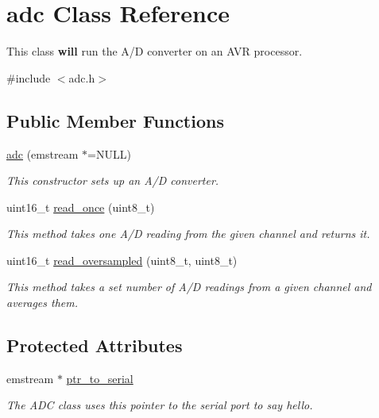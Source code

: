 \hypertarget{classadc}{\section{adc Class Reference}
\label{classadc}
}


This class {\bfseries will} run the A/\-D converter on an A\-V\-R processor.  




{\ttfamily \#include $<$adc.\-h$>$}

\subsection*{Public Member Functions}
\begin{DoxyCompactItemize}
\item 
\hyperlink{classadc_af3b8262c08f5fc5ae325a20622883424}{adc} (emstream $\ast$=N\-U\-L\-L)
\begin{DoxyCompactList}\small\item\em This constructor sets up an A/\-D converter. \end{DoxyCompactList}\item 
uint16\-\_\-t \hyperlink{classadc_a2190a59696a7093e1ea605e998ccf97e}{read\-\_\-once} (uint8\-\_\-t)
\begin{DoxyCompactList}\small\item\em This method takes one A/\-D reading from the given channel and returns it. \end{DoxyCompactList}\item 
uint16\-\_\-t \hyperlink{classadc_a58f1030fe64d3dea4ccd8a2687dd6fce}{read\-\_\-oversampled} (uint8\-\_\-t, uint8\-\_\-t)
\begin{DoxyCompactList}\small\item\em This method takes a set number of A/\-D readings from a given channel and averages them. \end{DoxyCompactList}\end{DoxyCompactItemize}
\subsection*{Protected Attributes}
\begin{DoxyCompactItemize}
\item 
\hypertarget{classadc_a14680b48b723bf1adddd2741ebb18a3e}{emstream $\ast$ \hyperlink{classadc_a14680b48b723bf1adddd2741ebb18a3e}{ptr\-\_\-to\-\_\-serial}}\label{classadc_a14680b48b723bf1adddd2741ebb18a3e}

\begin{DoxyCompactList}\small\item\em The A\-D\-C class uses this pointer to the serial port to say hello. \end{DoxyCompactList}\end{DoxyCompactItemize}


